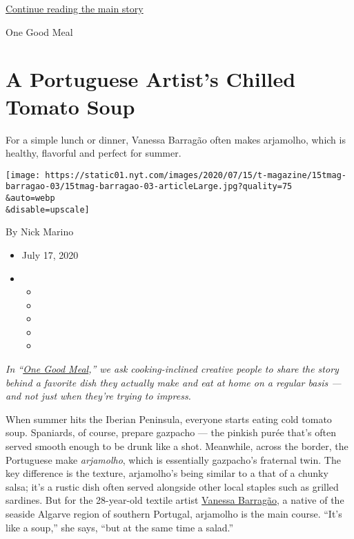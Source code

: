 \protect\hyperlink{after-sponsor}{Continue reading the main story}

One Good Meal

\hypertarget{a-portuguese-artists-chilled-tomato-soup}{%
\section{A Portuguese Artist's Chilled Tomato
Soup}\label{a-portuguese-artists-chilled-tomato-soup}}

For a simple lunch or dinner, Vanessa Barragão often makes arjamolho,
which is healthy, flavorful and perfect for summer.

\texttt{[image: https://static01.nyt.com/images/2020/07/15/t-magazine/15tmag-barragao-03/15tmag-barragao-03-articleLarge.jpg?quality=75\\\&auto=webp\\\&disable=upscale]}

By Nick Marino

\begin{itemize}
\item
  July 17, 2020
\item
  \begin{itemize}
  \item
  \item
  \item
  \item
  \item
  \end{itemize}
\end{itemize}

\emph{In
``}\href{https://www.nytimes.com/column/one-good-meal?module=inline}{\emph{One
Good Meal}}\emph{,'' we ask cooking-inclined creative people to share
the story behind a favorite dish they actually make and eat at home on a
regular basis --- and not just when they're trying to impress.}

When summer hits the Iberian Peninsula, everyone starts eating cold
tomato soup. Spaniards, of course, prepare gazpacho --- the pinkish
purée that's often served smooth enough to be drunk like a shot.
Meanwhile, across the border, the Portuguese make \emph{arjamolho},
which is essentially gazpacho's fraternal twin. The key difference is
the texture, arjamolho's being similar to a that of a chunky salsa; it's
a rustic dish often served alongside other local staples such as grilled
sardines. But for the 28-year-old textile artist
\href{https://www.instagram.com/vanessabarragao_work/?hl=en}{Vanessa
Barragão}, a native of the seaside Algarve region of southern Portugal,
arjamolho is the main course. ``It's like a soup,'' she says, ``but at
the same time a salad.''

